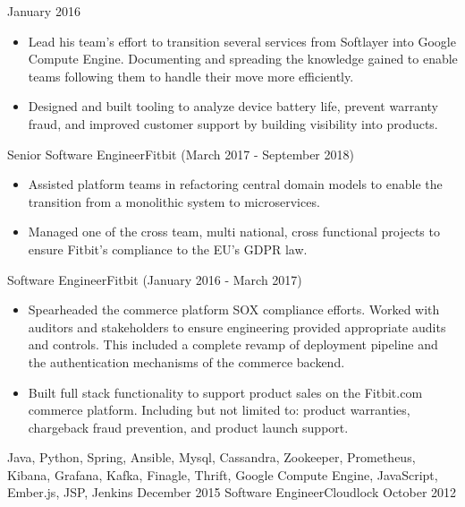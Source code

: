 \begin{experiences}
  {January 2016}   {
                      \begin{itemize}
                        \item Lead his team’s effort to transition several services from Softlayer into Google Compute Engine. Documenting and spreading the knowledge gained to enable teams following them to handle their move more efficiently.
                        \item Designed and built tooling to analyze device battery life, prevent warranty fraud, and improved customer support by building visibility into products.
                      \end{itemize}
                  }
                  {}
  \experience
  {}  {Senior Software Engineer}{Fitbit {\footnotesize (March 2017 - September 2018)}}
  {}   {
                      \begin{itemize}
                        \item Assisted platform teams in refactoring central domain models to enable the transition from a monolithic system to microservices.
                        \item Managed one of the cross team, multi national, cross functional projects to ensure Fitbit’s compliance to the EU’s GDPR law.
                      \end{itemize}
                  }
                  {}
   \experience
  {}  {Software Engineer}{Fitbit {\footnotesize (January 2016 - March 2017)}}
  {}   {
                      \begin{itemize}
                        \item Spearheaded the commerce platform SOX compliance efforts. Worked with auditors and stakeholders to ensure engineering provided appropriate audits and controls. This included a complete revamp of deployment pipeline and the authentication mechanisms of the commerce backend.
                        \item Built full stack functionality to support product sales on the Fitbit.com commerce platform. Including but not limited to: product warranties, chargeback fraud prevention, and product launch support.
                      \end{itemize}
                  }
                  {Java, Python, Spring, Ansible, Mysql, Cassandra, Zookeeper, Prometheus, Kibana, Grafana, Kafka, Finagle, Thrift, Google Compute Engine, JavaScript, Ember.js, JSP, Jenkins}
\emptySeparator
  \experience
  {December 2015}  {Software Engineer}{Cloudlock}
  {October 2012}   {
}
\end{experiences}
